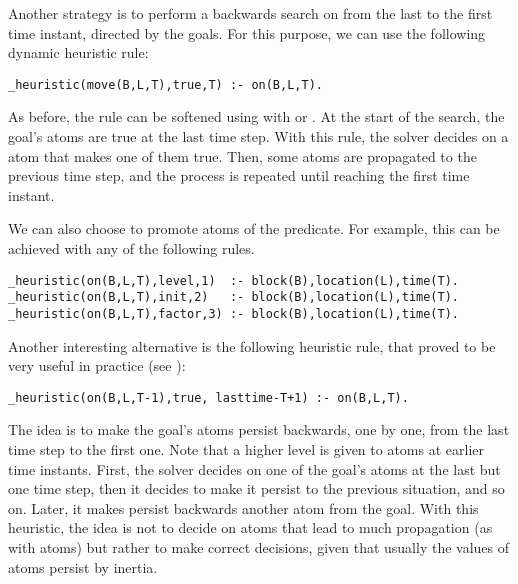 \begin{example}
Another strategy is to perform a backwards search on  from the last to the
first time instant, directed by the goals. 
For this purpose, we can use the following dynamic heuristic rule: 
\begin{lstlisting}[basicstyle=\small\ttfamily,numbers=none]
_heuristic(move(B,L,T),true,T) :- on(B,L,T).
\end{lstlisting}
As before, the rule can be softened using  with  or .
At the start of the search, the goal's  atoms are true at the last time step.
With this rule, the solver decides on a  atom that makes one of them true.
Then, some  atoms are propagated to the previous time step,
and the process is repeated until reaching the first time instant.

We can also choose to promote atoms of the  predicate.  
For example, this can be achieved with any of the  following rules.
\begin{lstlisting}[basicstyle=\small\ttfamily,numbers=none]
_heuristic(on(B,L,T),level,1)  :- block(B),location(L),time(T).
_heuristic(on(B,L,T),init,2)   :- block(B),location(L),time(T).
_heuristic(on(B,L,T),factor,3) :- block(B),location(L),time(T).
\end{lstlisting}

Another interesting alternative is the following heuristic rule,  
that proved to be very useful in practice (see \cite{gekaotroscwa13a}):
\begin{lstlisting}[basicstyle=\small\ttfamily,numbers=none]
_heuristic(on(B,L,T-1),true, lasttime-T+1) :- on(B,L,T).
\end{lstlisting}
The idea is to make the goal's  atoms persist backwards, 
one by one, from the last time step to the first one.
Note that a higher level is given to atoms at earlier time instants.
First, the solver decides on one of the goal's  atoms at the last but one time step,
then it decides to make it persist to the previous situation, and so on.
Later, it makes persist backwards another  atom from the goal.
With this heuristic,
the idea is not to decide on atoms that lead to much propagation (as with  atoms)
but rather to make correct decisions, 
given that usually the values of  atoms persist by inertia.
\eexample
\end{example}


